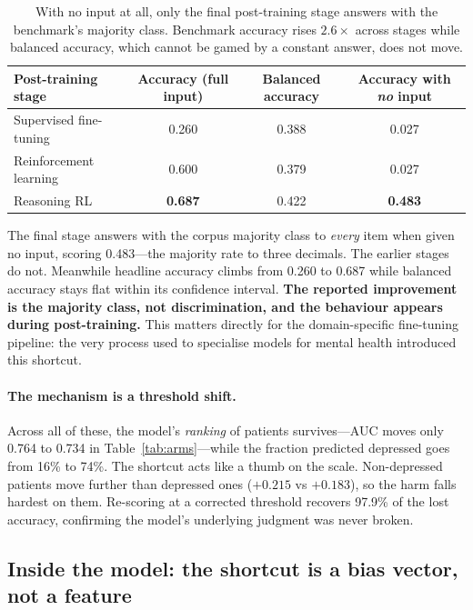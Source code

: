\documentclass{article}
\begin{document}
\begin{table}[t]
\centering
\caption{With no input at all, only the final post-training stage answers with
the benchmark's majority class. Benchmark accuracy rises $2.6\times$ across
stages while balanced accuracy, which cannot be gamed by a constant answer, does
not move.}
\label{tab:posttrain}
\begin{tabular}{lccc}
\toprule
Post-training stage & Accuracy (full input) & Balanced accuracy & Accuracy with \emph{no} input \\
\midrule
Supervised fine-tuning & 0.260 & 0.388 & 0.027 \\
Reinforcement learning & 0.600 & 0.379 & 0.027 \\
Reasoning RL           & \textbf{0.687} & 0.422 & \textbf{0.483} \\
\bottomrule
\end{tabular}
\end{table}

The final stage answers with the corpus majority class to \emph{every} item when
given no input, scoring 0.483---the majority rate to three decimals. The earlier
stages do not. Meanwhile headline accuracy climbs from 0.260 to 0.687 while
balanced accuracy stays flat within its confidence interval. \textbf{The reported
improvement is the majority class, not discrimination, and the behaviour appears
during post-training.} This matters directly for the domain-specific
fine-tuning pipeline: the very process used to specialise models for mental
health introduced this shortcut.

\paragraph{The mechanism is a threshold shift.} Across all of these, the model's
\emph{ranking} of patients survives---AUC moves only 0.764 to 0.734 in
Table~\ref{tab:arms}---while the fraction predicted depressed goes from 16\% to
74\%. The shortcut acts like a thumb on the scale. Non-depressed patients move
further than depressed ones ($+0.215$ vs $+0.183$), so the harm falls hardest on
them. Re-scoring at a corrected threshold recovers 97.9\% of the lost accuracy,
confirming the model's underlying judgment was never broken.

\subsection{Inside the model: the shortcut is a bias vector, not a feature}
\label{sec:probing}
\end{document}
